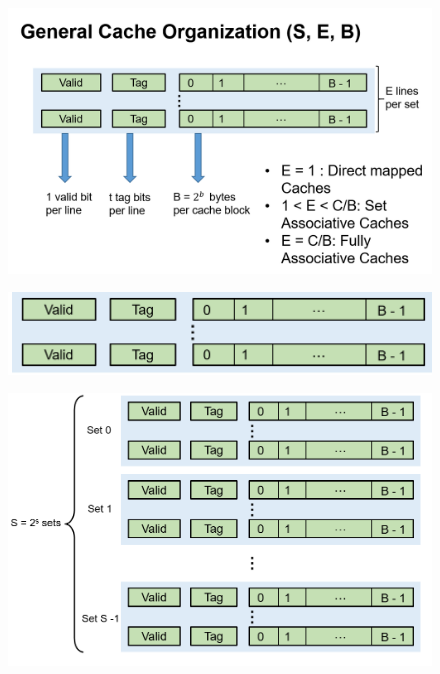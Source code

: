 \documentclass[a4paper]{article}
\begin{document}
\begin{figure}[h!]
  \includegraphics[width=\linewidth]{images/thetruth2.png}
  \caption{}
  \label{}
\end{figure}

\begin{figure}[h!]
  \includegraphics[width=\linewidth]{images/thetruth3.png}
  \caption{}
  \label{}
\end{figure}


\begin{figure}[h!]
  \includegraphics[width=\linewidth]{images/thetruth4.png}
  \caption{}
  \label{}
\end{figure}
\end{document}
